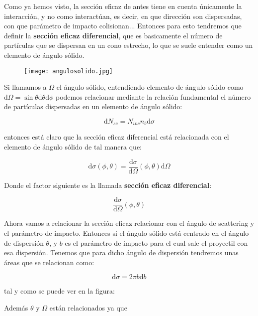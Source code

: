 \documentclass[12pt,a4paper]{book}
\newcommand{\D}{\mathrm{d}}
\begin{document}
Como ya hemos visto, la sección eficaz de antes tiene en cuenta únicamente la interacción, y no como interactúan, es decir, en que dirección son dispersadas, con que parámetro de impacto colisionan...  Entonces para esto tendremos que definir la \textbf{sección eficaz diferencial}, que es basicamente el número de partículas que se dispersan en un cono estrecho, lo que se suele entender como un elemento de ángulo sólido. \\

\begin{figure}[h!] \centering
\texttt{[image: angulosolido.jpg]}
\end{figure}


Si llamamos a $\Omega$ el ángulo sólido, entendiendo elemento de ángulo sólido como $\D \Omega = \sin \theta \D \theta \D \phi$ podemos relacionar mediante la relación fundamental el número de partículas dispersadas en un elemento de ángulo sólido:

$$ \D N_{sc} = N_{inc} n_b \D \sigma $$

entonces está claro que la sección eficaz diferencial está relacionada con el elemento de ángulo sólido de tal manera que:

\begin{equation}
\D \sigma (\phi, \theta) = \frac{\D \sigma}{\D \Omega} (\phi, \theta) \D \Omega
\end{equation}

Donde el factor siguiente es la llamada \textbf{sección eficaz diferencial}:

\begin{equation}
\frac{\D \sigma}{\D \Omega} (\phi, \theta)
\end{equation}

Ahora vamos a relacionar la sección eficaz relacionar con el ángulo de scattering y el parámetro de impacto. Entonces si el ángulo sólido está centrado en el ángulo de dispersión $\theta$, y $b$ es el parámetro de impacto para el cual sale el proyectil con esa dispersión. Tenemos que para dicho ángulo de dispersión tendremos unas áreas que se relacionan como:

\begin{equation}
\D \sigma = 2 \pi b \D b
\end{equation}

tal y como se puede ver en la figura:


Además $\theta$ y $\Omega$ están relacionados ya que 
\end{document}

